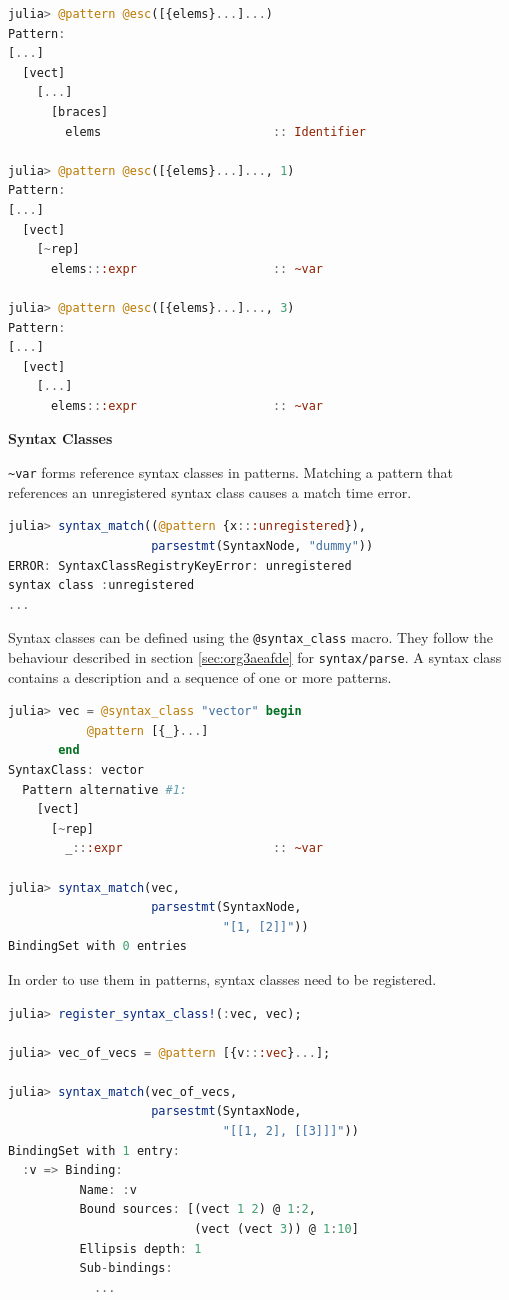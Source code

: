\documentclass{juliacon}
\begin{document}
\begin{lstlisting}[language=julia]
julia> @pattern @esc([{elems}...]...)
Pattern:
[...]
  [vect]
    [...]
      [braces]
        elems                        :: Identifier

julia> @pattern @esc([{elems}...]..., 1)
Pattern:
[...]
  [vect]
    [~rep]
      elems:::expr                   :: ~var

julia> @pattern @esc([{elems}...]..., 3)
Pattern:
[...]
  [vect]
    [...]
      elems:::expr                   :: ~var
\end{lstlisting}

\vspace{0.2cm}
\label{orge75d301}\vspace{0.2cm}
\textbf{Syntax Classes}\vspace{0.2cm}

\texttt{\textasciitilde{}var} forms reference syntax classes in patterns. Matching a pattern
that references an unregistered syntax class causes a match time
error.

\begin{lstlisting}[language=julia]
julia> syntax_match((@pattern {x:::unregistered}),
                    parsestmt(SyntaxNode, "dummy"))
ERROR: SyntaxClassRegistryKeyError: unregistered
syntax class :unregistered
...
\end{lstlisting}

Syntax classes can be defined using the \texttt{@syntax\_class} macro. They
follow the behaviour described in section \ref{sec:org3aeafde} for
\texttt{syntax/parse}. A syntax class contains a description and a sequence
of one or more patterns.

\begin{lstlisting}[language=julia]
julia> vec = @syntax_class "vector" begin
           @pattern [{_}...]
       end
SyntaxClass: vector
  Pattern alternative #1:
    [vect]
      [~rep]
        _:::expr                     :: ~var

julia> syntax_match(vec,
                    parsestmt(SyntaxNode,
                              "[1, [2]]"))
BindingSet with 0 entries
\end{lstlisting}

In order to use them in patterns, syntax classes need to be
registered.

\begin{lstlisting}[language=julia]
julia> register_syntax_class!(:vec, vec);

julia> vec_of_vecs = @pattern [{v:::vec}...];

julia> syntax_match(vec_of_vecs,
                    parsestmt(SyntaxNode,
                              "[[1, 2], [[3]]]"))
BindingSet with 1 entry:
  :v => Binding:
          Name: :v
          Bound sources: [(vect 1 2) @ 1:2,
                          (vect (vect 3)) @ 1:10]
          Ellipsis depth: 1
          Sub-bindings:
            ...
\end{lstlisting}
\end{document}
